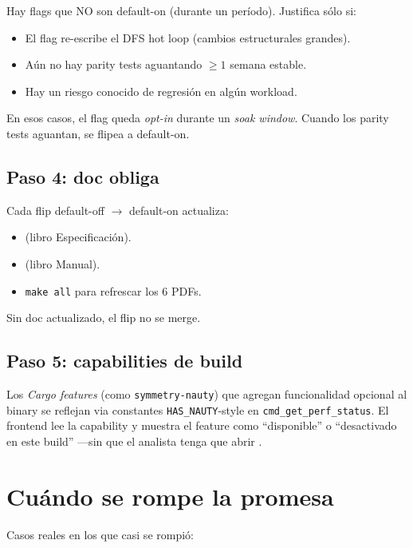 Hay flags que NO son default-on (durante un período). Justifica
sólo si:

\begin{itemize}
    \item El flag re-escribe el DFS hot loop (cambios estructurales
    grandes).
    \item Aún no hay parity tests aguantando \(\geq 1\) semana
    estable.
    \item Hay un riesgo conocido de regresión en algún workload.
\end{itemize}

\noindent
En esos casos, el flag queda \emph{opt-in} durante un \emph{soak
window}. Cuando los parity tests aguantan, se flipea a
default-on.

\subsection{Paso 4: doc obliga}

Cada flip default-off $\to$ default-on actualiza:

\begin{itemize}
    \item {} (libro Especificación).
    \item {} (libro Manual).
    \item \texttt{make all} para refrescar los 6 PDFs.
\end{itemize}

\noindent
Sin doc actualizado, el flip no se merge.

\subsection{Paso 5: capabilities de build}

Los \emph{Cargo features} (como \texttt{symmetry-nauty}) que
agregan funcionalidad opcional al binary se reflejan via
constantes \texttt{HAS\_NAUTY}-style en
\texttt{cmd\_get\_perf\_status}. El frontend lee la capability y
muestra el feature como ``disponible'' o ``desactivado en este
build'' ---sin que el analista tenga que abrir
.

\section{Cuándo se rompe la promesa}

Casos reales en los que casi se rompió:

